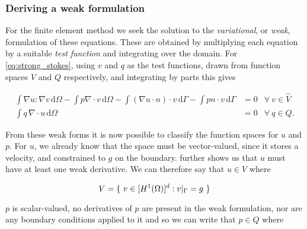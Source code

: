 \documentclass[thesis]{subfiles}
\begin{document}
\subsubsection{Deriving a weak formulation}


For the finite element method we seek the solution to the \textit{variational}, or \textit{weak}, formulation of these equations.
These are obtained by multiplying each equation by a suitable \textit{test function} and integrating over the domain.
For \cref{eq:strong_stokes}, using $v$ and $q$ as the test functions, drawn from function spaces $\hat V$ and $Q$ respectively, and integrating by parts this gives

\begin{subequations}
  \begin{align}
    \int \nabla u : \nabla v \, \textrm{d}\Omega
    - \int p \nabla \cdot v \, \textrm{d}\Omega
    - \int (\nabla u \cdot n) \cdot v \, \textrm{d}\Gamma
    - \int p n \cdot v \, \textrm{d}\Gamma
    &= 0
    &\forall \ v \in \hat V
    \label{eq:weak_stokes_extra_V} \\
    \int q \, \nabla \cdot u \, \textrm{d}\Omega
    &= 0
    &\forall \ q \in Q.
    \label{eq:weak_stokes_extra_Q}
  \end{align}
  \label{eq:weak_stokes_extra}
\end{subequations}

From these weak forms it is now possible to classify the function spaces for $u$ and $p$.
For $u$, we already know that the space must be vector-valued, since it stores a velocity, and constrained to $g$ on the boundary.
 further shows us that $u$ must have at least one weak derivative.
We can therefore say that $u \in V$ where

\begin{equation}
  V = \{ \ v \in [H^1(\Omega)]^d : v |_{\Gamma} = g \ \}  \\
  \label{eq:stokes_velocity_space}
\end{equation}

$p$ is scalar-valued, no derivatives of $p$ are present in the weak formulation, nor are any boundary conditions applied to it and so we can write that $p \in Q$ where
\end{document}
